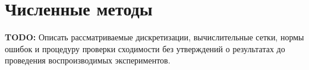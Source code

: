 \section{Численные методы}
\label{sec:numerical-methods}

\textbf{TODO:} Описать рассматриваемые дискретизации, вычислительные
сетки, нормы ошибок и процедуру проверки сходимости без утверждений
о результатах до проведения воспроизводимых экспериментов.
